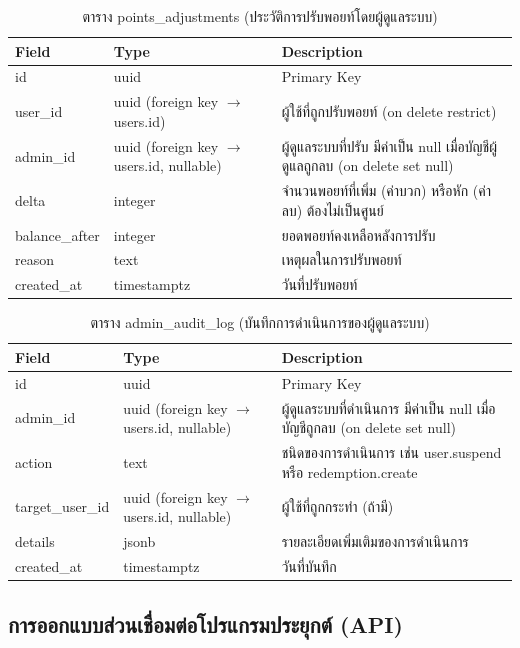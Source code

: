 \begin{table}[H]
\centering
\caption{ตาราง points\_adjustments (ประวัติการปรับพอยท์โดยผู้ดูแลระบบ)}
\label{tab:db_adjust}
\begin{tabular}{|p{3.6cm}|p{2.6cm}|p{6.8cm}|}
\hline
\textbf{Field} & \textbf{Type} & \textbf{Description} \\
\hline
id & uuid & Primary Key \\ \hline
user\_id & uuid (foreign key $\to$ users.id) & ผู้ใช้ที่ถูกปรับพอยท์ (on delete restrict) \\ \hline
admin\_id & uuid (foreign key $\to$ users.id, nullable) & ผู้ดูแลระบบที่ปรับ มีค่าเป็น null เมื่อบัญชีผู้ดูแลถูกลบ (on delete set null) \\ \hline
delta & integer & จำนวนพอยท์ที่เพิ่ม (ค่าบวก) หรือหัก (ค่าลบ) ต้องไม่เป็นศูนย์ \\ \hline
balance\_after & integer & ยอดพอยท์คงเหลือหลังการปรับ \\ \hline
reason & text & เหตุผลในการปรับพอยท์ \\ \hline
created\_at & timestamptz & วันที่ปรับพอยท์ \\
\hline
\end{tabular}
\end{table}

\begin{table}[H]
\centering
\caption{ตาราง admin\_audit\_log (บันทึกการดำเนินการของผู้ดูแลระบบ)}
\label{tab:db_support}
\begin{tabular}{|p{3.6cm}|p{2.6cm}|p{6.8cm}|}
\hline
\textbf{Field} & \textbf{Type} & \textbf{Description} \\
\hline
id & uuid & Primary Key \\ \hline
admin\_id & uuid (foreign key $\to$ users.id, nullable) & ผู้ดูแลระบบที่ดำเนินการ มีค่าเป็น null เมื่อบัญชีถูกลบ (on delete set null) \\ \hline
action & text & ชนิดของการดำเนินการ เช่น user.suspend หรือ redemption.create \\ \hline
target\_user\_id & uuid (foreign key $\to$ users.id, nullable) & ผู้ใช้ที่ถูกกระทำ (ถ้ามี) \\ \hline
details & jsonb & รายละเอียดเพิ่มเติมของการดำเนินการ \\ \hline
created\_at & timestamptz & วันที่บันทึก \\
\hline
\end{tabular}
\end{table}

\subsection{การออกแบบส่วนเชื่อมต่อโปรแกรมประยุกต์ (API)}

